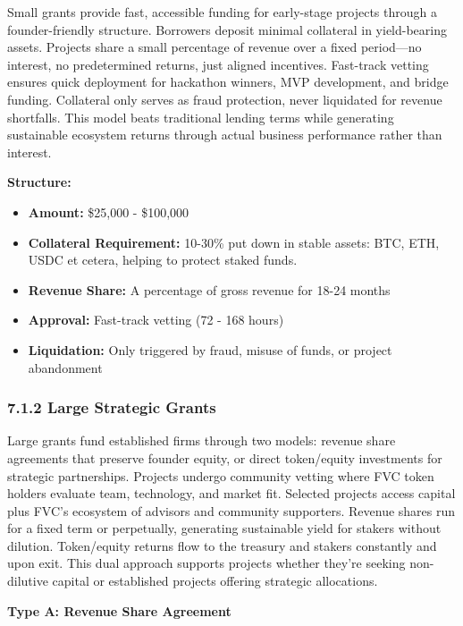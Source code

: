 \documentclass[
  paper=a4,
  ,captions=tableheading
]{scrartcl}
\providecommand{\tightlist}{%
  \setlength{\itemsep}{0pt}\setlength{\parskip}{0pt}}
\begin{document}
Small grants provide fast, accessible funding for early-stage projects
through a founder-friendly structure. Borrowers deposit minimal
collateral in yield-bearing assets. Projects share a small percentage of
revenue over a fixed period---no interest, no predetermined returns,
just aligned incentives. Fast-track vetting ensures quick deployment for
hackathon winners, MVP development, and bridge funding. Collateral only
serves as fraud protection, never liquidated for revenue shortfalls.
This model beats traditional lending terms while generating sustainable
ecosystem returns through actual business performance rather than
interest.

\textbf{Structure:}

\begin{itemize}
\tightlist
\item
  \textbf{Amount:} \$25,000 - \$100,000
\item
  \textbf{Collateral Requirement:} 10-30\% put down in stable assets:
  BTC, ETH, USDC et cetera, helping to protect staked funds.
\item
  \textbf{Revenue Share:} A percentage of gross revenue for 18-24 months
\item
  \textbf{Approval:} Fast-track vetting (72 - 168 hours)
\item
  \textbf{Liquidation:} Only triggered by fraud, misuse of funds, or
  project abandonment
\end{itemize}

\subsubsection{7.1.2 Large Strategic Grants}\label{large-strategic-grants}

Large grants fund established firms through two models: revenue share
agreements that preserve founder equity, or direct token/equity
investments for strategic partnerships. Projects undergo community
vetting where FVC token holders evaluate team, technology, and market
fit. Selected projects access capital plus FVC's ecosystem of advisors
and community supporters. Revenue shares run for a fixed term or
perpetually, generating sustainable yield for stakers without dilution.
Token/equity returns flow to the treasury and stakers constantly and
upon exit. This dual approach supports projects whether they're seeking
non-dilutive capital or established projects offering strategic
allocations.

\textbf{Type A: Revenue Share Agreement}
\end{document}
